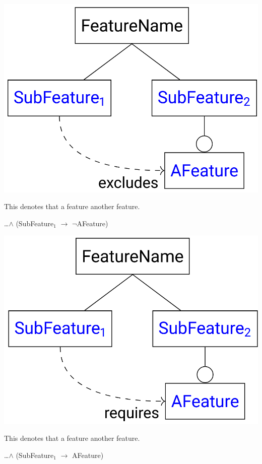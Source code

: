 \documentclass[
    ../../Software_Engineering_Summary.tex,
]
{subfiles}
\begin{document}
\begin{minipage}
    [c]{0.35\textwidth}
    \centering
    \includegraphics[width = \textwidth]{Pics/12/FeatureDiagramExcludes.png}
\end{minipage}
\begin{minipage}
    [c]{0.65\textwidth}
    This denotes that a feature  another feature.
    \begin{defbox}
        \dots $\land$ (SubFeature$_1$ $\rightarrow$ $\neg$AFeature)
    \end{defbox}
\end{minipage}

\begin{minipage}
    [c]{0.35\textwidth}
    \centering
    \includegraphics[width = \textwidth]{Pics/12/FeatureDiagramRequires.png}
\end{minipage}
\begin{minipage}
    [c]{0.65\textwidth}
    This denotes that a feature  another feature.
    \begin{defbox}
        \dots $\land$ (SubFeature$_1$ $\rightarrow$ AFeature)
    \end{defbox}
\end{minipage}
\end{document}
